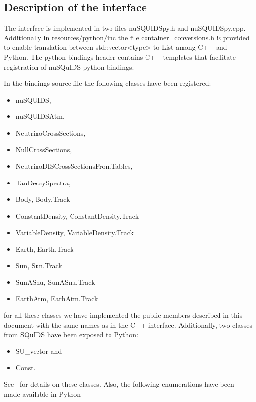\documentclass[3p,12pt]{elsarticle}
\newcommand{\ttf}{\ttfamily}
\newcommand{\nuSQUIDS}{{\ttfamily nuSQUIDS}}
\begin{document}
\subsection{Description of the interface}

The interface is implemented in two files {\ttf nuSQUIDSpy.h} and {\ttf nuSQUIDSpy.cpp}. 
Additionally in {\ttf resources/python/inc} the file {\ttf container\_conversions.h} 
is provided to enable translation between {\ttf std::vector<type>} to  {\ttf List} among {\ttf C++} and {\ttf Python}. 
The python bindings header contains {\ttf C++} templates that facilitate registration of {\ttf nuSQuIDS} python bindings.

In the bindings source file the following classes have been registered:
\begin{itemize}
  \item \nuSQUIDS,
  \item {\ttf nuSQUIDSAtm},
  \item {\ttf NeutrinoCrossSections},
  \item {\ttf NullCrossSections},
  \item {\ttf NeutrinoDISCrossSectionsFromTables},
  \item {\ttf TauDecaySpectra},
  \item {\ttf Body}, {\ttf Body.Track}
  \item {\ttf ConstantDensity}, {\ttf ConstantDensity.Track}
  \item {\ttf VariableDensity}, {\ttf VariableDensity.Track}
  \item {\ttf Earth}, {\ttf Earth.Track}
  \item {\ttf Sun}, {\ttf Sun.Track}
  \item {\ttf SunASnu}, {\ttf SunASnu.Track}
  \item {\ttf EarthAtm}, {\ttf EarhAtm.Track}
\end{itemize}
for all these classes we have implemented the public members described in this document with 
the same names as in the {\ttf C++} interface. Additionally, two classes from SQuIDS have been exposed to {\ttf Python}:
\begin{itemize}
  \item {\ttf SU\_vector} and
  \item {\ttf Const}.
\end{itemize}
See~\cite{SQUIDS} for details on these classes. Also, the following enumerations have been made available in {\ttf Python}
\end{document}
